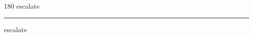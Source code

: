 
\begin{frame}
\begin{center}
\begin{turn}{180}
{\fontsize{2.5cm}{1em}\selectfont escalate}
\end{turn}
\vspace{1em}\par  
\hrule
\vspace{1em}\par  
{\fontsize{2.5cm}{1em}\selectfont escalate}
\end{center}
\end{frame}
